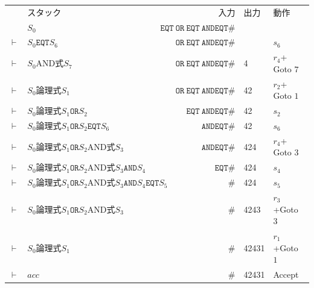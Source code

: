 \documentclass{jarticle}
\newcommand{\eqtex}{\texttt{EQT}}
\newcommand{\ANDex}{\mbox{AND式}}
\newcommand{\LOGex}{\mbox{論理式}}
\newcommand{\andtx}{\texttt{AND}}
\newcommand{\ortx}{\texttt{OR}}
\begin{document}
\begin{tabular}{clrl|l}
         & スタック & 入力 & 出力 & 動作\\
         & $S_0$ & $\eqtex\ \ortx\ \eqtex\ \andtx \eqtex \#$ &   & \\
$\vdash$ & $S_0\eqtex S_6$ & $\ortx\ \eqtex\ \andtx \eqtex \#$ &  & $s_6$\\
$\vdash$ & $S_0\ANDex S_7$ & $\ortx\ \eqtex\ \andtx \eqtex \#$ & 4 & $r_4$+ Goto $7$\\
$\vdash$ & $S_0\LOGex S_1$ & $\ortx\ \eqtex\ \andtx \eqtex \#$ & 42 & $r_2$+ Goto $1$\\
$\vdash$ & $S_0\LOGex S_1\ortx S_2$ & $\eqtex\ \andtx \eqtex \#$ & 42 & $s_2$\\
$\vdash$ & $S_0\LOGex S_1\ortx S_2\eqtex S_6$ & $\andtx \eqtex \#$ & 42 & $s_6$\\
$\vdash$ & $S_0\LOGex S_1\ortx S_2\ANDex S_3$ & $\andtx \eqtex \#$ & 424 & $r_4$+ Goto $3$\\
$\vdash$ & $S_0\LOGex S_1\ortx S_2\ANDex S_3\andtx S_4$ & $\eqtex \#$ & 424 & $s_4$\\
$\vdash$ & $S_0\LOGex S_1\ortx S_2\ANDex S_3\andtx S_4\eqtex S_5$ & $\#$ & 424 & $s_5$\\
$\vdash$ & $S_0\LOGex S_1\ortx S_2\ANDex S_3$ & $\#$ & 4243 & $r_3$+Goto $3$\\
$\vdash$ & $S_0\LOGex S_1$ & $\#$ & 42431 & $r_1$+Goto $1$\\
$\vdash$ & $acc$ & $\#$ & 42431 & {\sf Accept}\\
\end{tabular}
\end{document}
